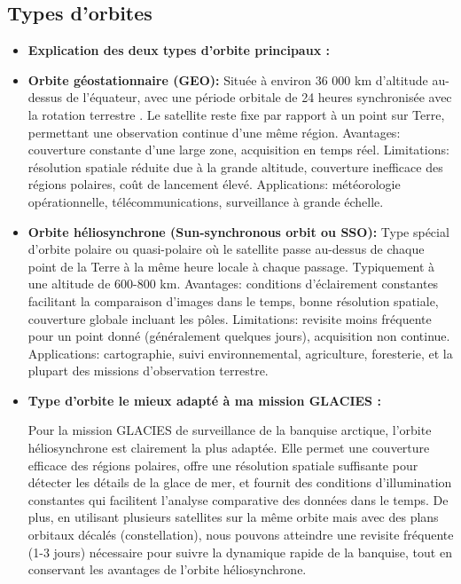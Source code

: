 \documentclass[12pt,a4paper]{article}
\begin{document}
\subsection{Types d'orbites}
\begin{itemize}[label=---]
    \item \textbf{Explication des deux types d'orbite principaux :}
    
    \item \textbf{Orbite géostationnaire (GEO):} Située à environ 36 000 km d'altitude au-dessus de l'équateur, avec une période orbitale de 24 heures synchronisée avec la rotation terrestre \citep{Weather2023, Capderou2014}. Le satellite reste fixe par rapport à un point sur Terre, permettant une observation continue d'une même région. Avantages: couverture constante d'une large zone, acquisition en temps réel. Limitations: résolution spatiale réduite due à la grande altitude, couverture inefficace des régions polaires, coût de lancement élevé. Applications: météorologie opérationnelle, télécommunications, surveillance à grande échelle.
    
    \item \textbf{Orbite héliosynchrone (Sun-synchronous orbit ou SSO):} Type spécial d'orbite polaire ou quasi-polaire où le satellite passe au-dessus de chaque point de la Terre à la même heure locale à chaque passage. Typiquement à une altitude de 600-800 km. Avantages: conditions d'éclairement constantes facilitant la comparaison d'images dans le temps, bonne résolution spatiale, couverture globale incluant les pôles. Limitations: revisite moins fréquente pour un point donné (généralement quelques jours), acquisition non continue. Applications: cartographie, suivi environnemental, agriculture, foresterie, et la plupart des missions d'observation terrestre.
    
    \item \textbf{Type d'orbite le mieux adapté à ma mission GLACIES :}
    
    Pour la mission GLACIES de surveillance de la banquise arctique, l'orbite héliosynchrone est clairement la plus adaptée. Elle permet une couverture efficace des régions polaires, offre une résolution spatiale suffisante pour détecter les détails de la glace de mer, et fournit des conditions d'illumination constantes qui facilitent l'analyse comparative des données dans le temps. De plus, en utilisant plusieurs satellites sur la même orbite mais avec des plans orbitaux décalés (constellation), nous pouvons atteindre une revisite fréquente (1-3 jours) nécessaire pour suivre la dynamique rapide de la banquise, tout en conservant les avantages de l'orbite héliosynchrone.
\end{itemize}
\end{document}
